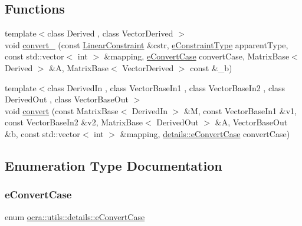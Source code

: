 \subsection*{Functions}
\begin{DoxyCompactItemize}
\item 
{\footnotesize template$<$class Derived , class Vector\+Derived $>$ }\\void \hyperlink{namespaceocra_1_1utils_1_1details_a47a75bc377ce3547c94c54c6d500fffb}{convert\+\_\+} (const \hyperlink{namespaceocra_ae8b87cf4099be3efc3b410019ad2046e}{Linear\+Constraint} \&cstr, \hyperlink{namespaceocra_aedff92662043a7f15dc263363db7939b}{e\+Constraint\+Type} apparent\+Type, const std\+::vector$<$ int $>$ \&mapping, \hyperlink{namespaceocra_1_1utils_1_1details_a617d399055aa54cfdf2d3199ca91c399}{e\+Convert\+Case} convert\+Case, Matrix\+Base$<$ Derived $>$ \&A, Matrix\+Base$<$ Vector\+Derived $>$ const \&\+\_\+b)
\item 
{\footnotesize template$<$class Derived\+In , class Vector\+Base\+In1 , class Vector\+Base\+In2 , class Derived\+Out , class Vector\+Base\+Out $>$ }\\void \hyperlink{namespaceocra_1_1utils_1_1details_a127392d7e9e17996ff887583037da190}{convert} (const Matrix\+Base$<$ Derived\+In $>$ \&M, const Vector\+Base\+In1 \&v1, const Vector\+Base\+In2 \&v2, Matrix\+Base$<$ Derived\+Out $>$ \&A, Vector\+Base\+Out \&b, const std\+::vector$<$ int $>$ \&mapping, \hyperlink{namespaceocra_1_1utils_1_1details_a617d399055aa54cfdf2d3199ca91c399}{details\+::e\+Convert\+Case} convert\+Case)
\end{DoxyCompactItemize}


\subsection{Enumeration Type Documentation}
\hypertarget{namespaceocra_1_1utils_1_1details_a617d399055aa54cfdf2d3199ca91c399}{}\label{namespaceocra_1_1utils_1_1details_a617d399055aa54cfdf2d3199ca91c399} 
\subsubsection{\texorpdfstring{e\+Convert\+Case}{eConvertCase}}
{\footnotesize\ttfamily enum \hyperlink{namespaceocra_1_1utils_1_1details_a617d399055aa54cfdf2d3199ca91c399}{ocra\+::utils\+::details\+::e\+Convert\+Case}}

